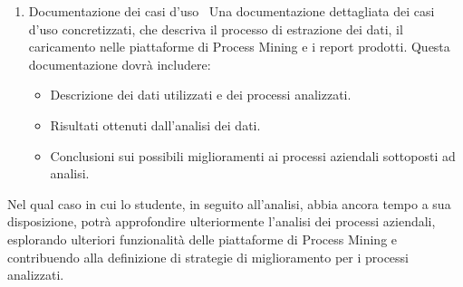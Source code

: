 \begin{enumerate}
\item Documentazione dei casi d'uso \
Una documentazione dettagliata dei casi d'uso concretizzati, che descriva il processo di estrazione dei dati, il caricamento nelle piattaforme di Process Mining e i report prodotti. Questa documentazione dovrà includere:
\begin{itemize}
\item Descrizione dei dati utilizzati e dei processi analizzati.
\item Risultati ottenuti dall'analisi dei dati.
\item Conclusioni sui possibili miglioramenti ai processi aziendali sottoposti ad analisi.
\end{itemize}

\end{enumerate}

Nel qual caso in cui lo studente, in seguito all'analisi, abbia ancora tempo a sua disposizione, potrà approfondire ulteriormente l'analisi dei processi aziendali, esplorando ulteriori funzionalità delle piattaforme di Process Mining e contribuendo alla definizione di strategie di miglioramento per i processi analizzati.
